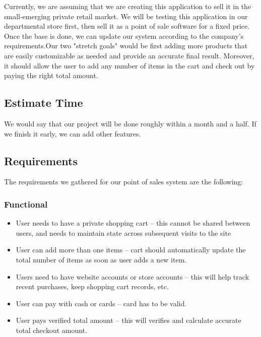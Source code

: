 \documentclass[10pt,conference,onecolumn,compsoc]{IEEEtran}
\begin{document}
Currently, we are assuming that we are creating this application to sell it in the small-emerging private retail market. We will be testing this application in our departmental store first, then sell it as a point of sale software for a fixed price. Once the base is done, we can update our system according to the company's requirements.Our two  "stretch goals" would be first adding more products that are easily customizable as needed and provide an accurate final result. Moreover, it should allow the user to add any number of items in the cart and check out by paying the right total amount.\\
\subsection{Estimate Time}
We would say that our project will be done roughly within a month and a half. If we finish it early, we can add other features.





\subsection{Requirements}
The requirements we gathered for our point of sales system are the following: 



\subsubsection{Functional}
\begin{itemize}
\item User needs to have a private shopping cart -- this cannot be shared between users, and needs to maintain state across subsequent visits to the site
\item User can add more than one items -- cart should automatically update the total number of items as soon as user adds a new item.
\item Users need to have website accounts or store accounts -- this will help track recent purchases, keep shopping cart records, etc. 
\item User can pay with cash or cards -- card has to be valid.
\item User pays verified total amount -- this will verifies and calculate accurate total checkout amount.

\end{itemize}
\end{document}
